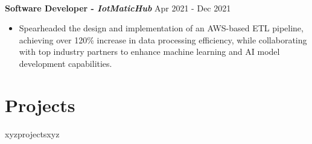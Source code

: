 \documentclass[a4paper,10pt]{article}
\begin{document}
\vspace{-8pt}
\textbf{\\ Software Developer - \textit{IotMaticHub}}  
\hfill Apr 2021 - Dec 2021
\begin{itemize}
\item Spearheaded the design and implementation of an AWS-based ETL pipeline, achieving over 120\% increase in data processing efficiency, while collaborating with top industry partners to enhance machine learning and AI model development capabilities.
\end{itemize}

\vspace{-10pt}
\section*{Projects}
\vspace{-3pt}
xyzprojectsxyz
\end{document}
